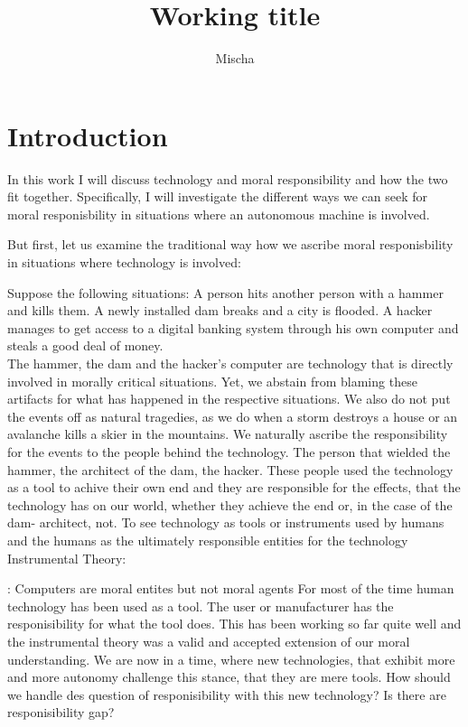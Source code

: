 \documentclass{article}
\title{Working title}
\author{Mischa}
\begin{document}
\begin{titlepage}
	\maketitle
\end{titlepage}
\tableofcontents

\section{Introduction}

In this work I will discuss technology and moral responsibility and how the two
fit together. Specifically, I will investigate the different ways we can seek
for moral responisbility in situations where an autonomous machine is involved.

But first, let us examine the traditional way how we ascribe moral
responisbility in situations where technology is involved:

Suppose the following situations: A person hits another person with a hammer and
kills them. A newly installed dam breaks and a city is flooded. A hacker manages
to get access to a digital banking system through his own computer and steals a good deal of money.\\

The hammer, the dam and the hacker's computer are technology that is directly
involved in morally critical situations. Yet, we abstain from blaming these
artifacts for what has happened in the respective situations. We also do not put
the events off as natural tragedies, as we do when a storm destroys a house or
an avalanche kills a skier in the mountains. We naturally ascribe the
responsibility for the events to the people behind the technology.
The person that wielded the hammer, the architect of the dam, the hacker.
These people used the technology as a tool to achive their own end and they are
responsible for the effects, that the technology has on our world, whether they
achieve the end or, in the case of the dam- architect, not.
To see technology as tools or instruments used by humans and the humans as the ultimately
responsible entities for the technology
Instrumental Theory:

\cite{johnson2006computer}: Computers are moral entites but not moral agents
For most of the time human technology has been used as a tool.
The user or manufacturer has the responisibility for what the tool does.
This has been working so far quite well and the instrumental theory was a valid
and accepted extension of our moral understanding.
We are now in a time, where new technologies, that exhibit more and more
autonomy challenge this stance, that they are mere tools. How should we handle
des question of responisibility with this new technology? Is there are
responisibility gap?
\end{document}
